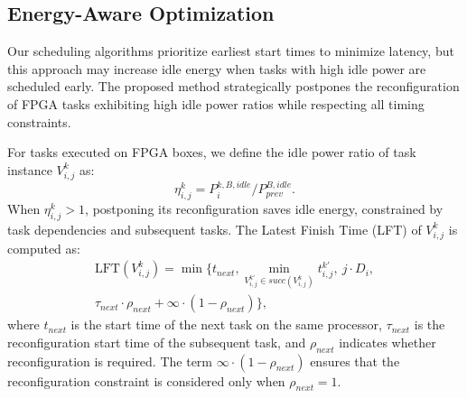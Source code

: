 \documentclass{IEEEtaes}
\begin{document}
\subsection{Energy-Aware Optimization}

 Our scheduling algorithms prioritize earliest start times to minimize latency, but this approach may increase idle energy when tasks with high idle power are scheduled early. The proposed method strategically postpones the reconfiguration of FPGA tasks exhibiting high idle power ratios while respecting all timing constraints.

For tasks executed on FPGA boxes, we define the idle power ratio of task instance $V_{i,j}^k$ as:
\begin{equation}
    \eta_{i,j}^k=P_{i}^{k,B,idle}/P_{prev}^{B,idle}.
\end{equation}
When $\eta_{i,j}^k>1$, postponing its reconfiguration saves idle energy, constrained by task dependencies and subsequent tasks. The Latest Finish Time (LFT) of $V_{i,j}^k$ is computed as:
\begin{multline}
    \text{LFT}(V_{i,j}^k)=\min\bigg\{ t_{next},\min_{V_{i,j}^{k'}\in succ(V_{i,j}^{k})}t_{i,j}^{k'},\ j\cdot D_i,  \\
    \tau_{next}\cdot\rho_{next} + \infty\cdot(1-\rho_{next})\bigg\},
\label{equ:LFT}
\end{multline}
where $t_{next}$ is the start time of the next task on the same processor, $\tau_{next}$ is the reconfiguration start time of the subsequent task, and $\rho_{next}$ indicates whether reconfiguration is required. The term $\infty\cdot(1-\rho_{next})$ ensures that the reconfiguration constraint is considered only when $\rho_{next}=1$.
\end{document}
